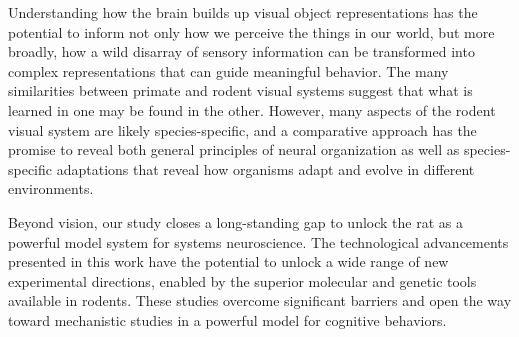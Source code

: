Understanding how the brain builds up visual object representations has the potential to inform not only how we perceive the things in our world, but more broadly, how a wild disarray of sensory information can be transformed into complex representations that can guide meaningful behavior. The many similarities between primate and rodent visual systems suggest that what is learned in one may be found in the other. However, many aspects of the rodent visual system are likely species-specific, and a comparative approach has the promise to reveal both general principles of neural organization as well as species-specific adaptations that reveal how organisms adapt and evolve in different environments. 

Beyond vision, our study closes a long-standing gap to unlock the rat as a powerful model system for systems neuroscience. The technological advancements presented in this work have the potential to unlock a wide range of new experimental directions, enabled by the superior molecular and genetic tools available in rodents. These studies overcome significant barriers and open the way toward mechanistic studies in a powerful model for cognitive behaviors.
